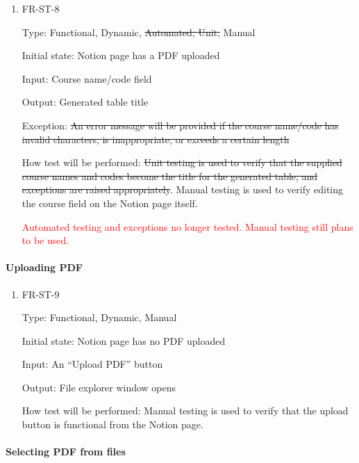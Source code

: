 \documentclass[12pt, titlepage]{article}
\begin{document}
\begin{enumerate}

\item{FR-ST-8\\}

Type: Functional, Dynamic, \sout{Automated, Unit,} Manual 

Initial state: Notion page has a PDF uploaded 

Input: Course name/code field 

Output: Generated table title  

Exception: \sout{An error message will be provided if the course name/code has invalid characters, is inappropriate, or exceeds a certain length} 

How test will be performed: \sout{Unit testing is used to verify that the supplied course names and codes become the title for the generated table, and exceptions are raised appropriately}. Manual testing is used to verify editing the course field on the Notion page itself. 

\textcolor{red}{Automated testing and exceptions no longer tested. Manual testing still plans to be used.}

\end{enumerate}

\paragraph{Uploading PDF}

\begin{enumerate}

\item{FR-ST-9\\}

Type: Functional, Dynamic, Manual 

Initial state: Notion page has no PDF uploaded 

Input: An “Upload PDF” button 

Output: File explorer window opens 

How test will be performed: Manual testing is used to verify that the upload button is functional from the Notion page. 

\end{enumerate}

\paragraph{Selecting PDF from files}
\end{document}
